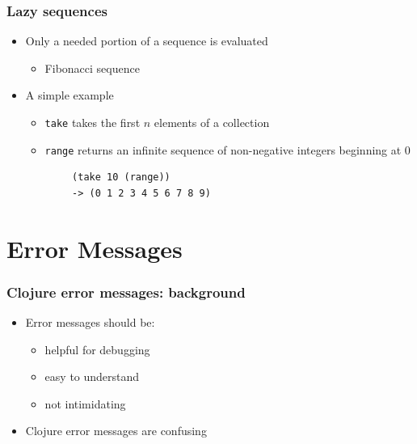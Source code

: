 \documentclass{beamer}
\begin{document}
\begin{frame}[fragile]
\frametitle{Lazy sequences}
	\begin{itemize}
  	  \item Only a needed portion of a sequence is evaluated
  	  \begin{itemize}
  	    \item Fibonacci sequence
  	  \end{itemize}
  	  \item A simple example
  	  \begin{itemize}
  	    \item \texttt{take} takes the first $n$ elements of a collection
  	    \item \texttt{range} returns an infinite sequence of non-negative integers beginning at 0
  	  \end{itemize}
  	  \begin{verbatim}
  	 	(take 10 (range))
  	 	-> (0 1 2 3 4 5 6 7 8 9)
  	  \end{verbatim}
   \end{itemize}
\end{frame}

\section{Error Messages}

\begin{frame}
\frametitle{Clojure error messages: background}
	\begin{itemize}
  		\item Error messages should be:
  		\begin{itemize}
  	 		\item helpful for debugging
  	 		\item easy to understand
  	 		\item not intimidating
  		\end{itemize}
  		\item Clojure error messages are confusing
	 \end{itemize}
	 
\end{frame}
\end{document}
